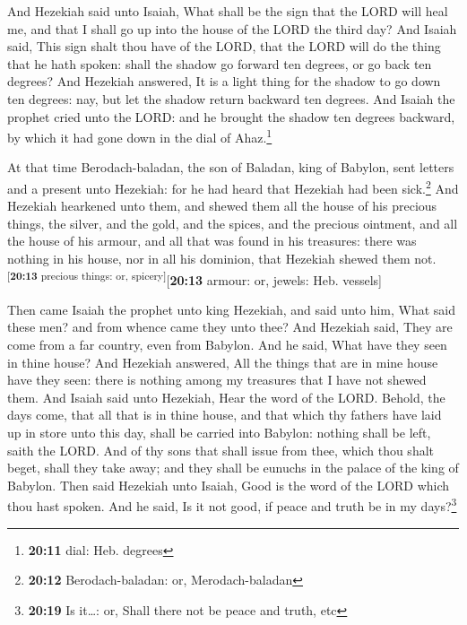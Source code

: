  And Hezekiah said unto Isaiah, What shall be the sign
that the LORD will heal me, and that I shall go up into the house of the
LORD the third day?  And Isaiah said, This sign shalt thou
have of the LORD, that the LORD will do the thing that he hath spoken:
shall the shadow go forward ten degrees, or go back ten degrees?
 And Hezekiah answered, It is a light thing for the
shadow to go down ten degrees: nay, but let the shadow return backward
ten degrees.  And Isaiah the prophet cried unto the LORD:
and he brought the shadow ten degrees backward, by which it had gone
down in the dial of Ahaz.\footnote{\textbf{20:11} dial: Heb. degrees}

 At that time Berodach-baladan, the son of Baladan, king
of Babylon, sent letters and a present unto Hezekiah: for he had heard
that Hezekiah had been sick.\footnote{\textbf{20:12} Berodach-baladan:
  or, Merodach-baladan}  And Hezekiah hearkened unto
them, and shewed them all the house of his precious things, the silver,
and the gold, and the spices, and the precious ointment, and all the
house of his armour, and all that was found in his treasures: there was
nothing in his house, nor in all his dominion, that Hezekiah shewed them
not.\textsuperscript{{[}\textbf{20:13} precious things: or,
spicery{]}}{[}\textbf{20:13} armour: or, jewels: Heb. vessels{]}

 Then came Isaiah the prophet unto king Hezekiah, and
said unto him, What said these men? and from whence came they unto thee?
And Hezekiah said, They are come from a far country, even from Babylon.
 And he said, What have they seen in thine house? And
Hezekiah answered, All the things that are in mine house have they seen:
there is nothing among my treasures that I have not shewed them.
 And Isaiah said unto Hezekiah, Hear the word of the
LORD.  Behold, the days come, that all that is in thine
house, and that which thy fathers have laid up in store unto this day,
shall be carried into Babylon: nothing shall be left, saith the LORD.
 And of thy sons that shall issue from thee, which thou
shalt beget, shall they take away; and they shall be eunuchs in the
palace of the king of Babylon.  Then said Hezekiah unto
Isaiah, Good is the word of the LORD which thou hast spoken. And he
said, Is it not good, if peace and truth be in my days?\footnote{\textbf{20:19}
  Is it\ldots: or, Shall there not be peace and truth, etc}

